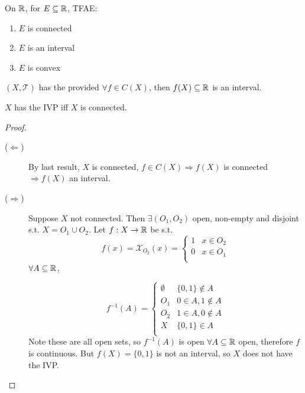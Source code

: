 \begin{prop}
    On $\mathbb{R}$, for $E \subseteq \mathbb{R}$, TFAE:
    \begin{enumerate}
        \item $E$ is connected
        \item $E$  is an interval
        \item $E$  is convex
    \end{enumerate}  
\end{prop}

\begin{defn}
    $(X, \mathcal{T})$ has the  provided $\forall f \in C(X)$, 
    then $f(X) \subseteq \mathbb{R}$ is an interval.  
\end{defn}

\begin{prop}
    $X$ has the IVP iff $X$ is connected.  
\end{prop}

\begin{proof} \leavevmode
    \begin{description}
        \item[($\Leftarrow$)] By last result, $X$ is connected, $f \in C(X) \Rightarrow f(X)$ is connected 
        $\Rightarrow f(X) $ an interval.
        \item[($\Rightarrow$)] Suppose $X$ not connected. Then $\exists (O_1, O_2)$ open, non-empty 
        and disjoint s.t. $X = O_1 \cup O_2$. Let $f : X \to \mathbb{R}$ be s.t.
        \[
            f(x) = \mathcal{X}_{O_2}(x) = \begin{cases}
                1 & x \in O_2 \\
                0 & x \in O_1 \\
            \end{cases}
        \]      
        $\forall A \subseteq \mathbb{R}$,
        
        \[
            f^{-1}(A) = \begin{cases}
                \emptyset & \{0, 1\} \notin A \\
                O_1 & 0 \in A, 1 \notin A \\
                O_2 & 1 \in A, 0 \notin A \\
                X & \{0, 1\} \in A \\
            \end{cases}
        \] 
        Note these are all open sets, so $f^{-1}(A)$ is open $\forall A \subseteq \mathbb{R}$ open, therefore
        $f$ is continuous. But $f(X) = \{0, 1\}$ is not an interval, so $X$ does not have the IVP. \qedhere  
    \end{description}
     
\end{proof}

